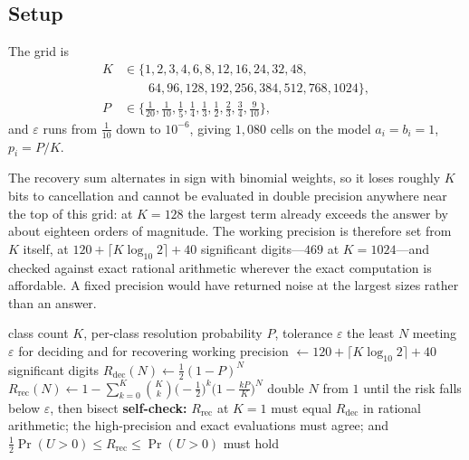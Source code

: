 \documentclass[conference]{IEEEtran}
\theoremstyle{definition}
\begin{document}
\subsection{Setup}

The grid is
\begin{align*}
K &\in \{1,2,3,4,6,8,12,16,24,32,48,\\
  &\qquad 64,96,128,192,256,384,512,768,1024\},\\
P &\in \{\tfrac1{20},\tfrac1{10},\tfrac15,\tfrac14,\tfrac13,\tfrac12,\tfrac23,\tfrac34,\tfrac9{10}\},
\end{align*}
and $\varepsilon$ runs from $\tfrac1{10}$ down to $10^{-6}$, giving $1{,}080$ cells on the
model $a_{i}=b_{i}=1$, $p_{i}=P/K$.

The recovery sum alternates in sign with binomial weights, so it loses roughly $K$ bits to
cancellation and cannot be evaluated in double precision anywhere near the top of this grid:
at $K=128$ the largest term already exceeds the answer by about eighteen orders of magnitude.
The working precision is therefore set from $K$ itself, at
$120+\lceil K\log_{10}2\rceil+40$ significant digits---$469$ at $K=1024$---and checked
against exact rational arithmetic wherever the exact computation is affordable. A fixed
precision would have returned noise at the largest sizes rather than an answer.

\begin{algorithm}[htbp]
\caption{The two thresholds, at a precision set from $K$}
\label{alg:threshold}
\begin{algorithmic}[1]
\REQUIRE class count $K$, per-class resolution probability $P$, tolerance $\varepsilon$
\ENSURE the least $N$ meeting $\varepsilon$ for deciding and for recovering
\STATE working precision $\leftarrow 120+\lceil K\log_{10}2\rceil+40$ significant digits
\STATE $R_{\mathrm{dec}}(N)\leftarrow\tfrac12(1-P)^{N}$ 
\STATE $R_{\mathrm{rec}}(N)\leftarrow1-\sum_{k=0}^{K}\binom{K}{k}\bigl(-\tfrac12\bigr)^{k}
       \bigl(1-\tfrac{kP}{K}\bigr)^{N}$
  \STATE double $N$ from $1$ until the risk falls below $\varepsilon$, then bisect
\ENDFOR
\STATE \textbf{self-check:} $R_{\mathrm{rec}}$ at $K=1$ must equal $R_{\mathrm{dec}}$ in
       rational arithmetic; the high-precision and exact evaluations must agree; and
       $\tfrac12\Pr(U>0)\le R_{\mathrm{rec}}\le\Pr(U>0)$ must hold
\end{algorithmic}
\end{algorithm}
\end{document}
